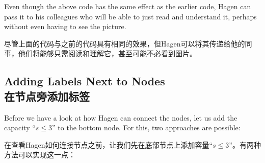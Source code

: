Even though the above code has the same effect as the earlier code, Hagen can
pass it to his colleagues who will be able to just read and understand it,
perhaps without even having to see the picture.


尽管上面的代码与之前的代码具有相同的效果，但Hagen可以将其传递给他的同事，他们将能够只需阅读和理解它，甚至可能不必看到图片。


\subsection{Adding Labels Next to Nodes\\在节点旁添加标签}

Before we have a look at how Hagen can connect the nodes, let us add the
capacity ``$s \le 3$'' to the bottom node. For this, two approaches are
possible:

在查看Hagen如何连接节点之前，让我们先在底部节点上添加容量“$s \le 3$”。有两种方法可以实现这一点：

